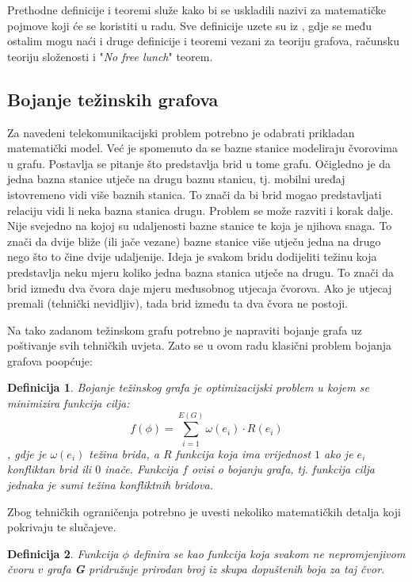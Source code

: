 \documentclass[times, utf8, diplomski, numeric]{fer}
\newtheorem{definition}{Definicija}
\begin{document}
Prethodne definicije i teoremi služe kako bi se uskladili nazivi za matematičke pojmove koji će se koristiti u radu. Sve definicije uzete su iz \cite{lit16, lit15, lit19}, gdje se među ostalim mogu naći i druge definicije i teoremi vezani za teoriju grafova, računsku teoriju složenosti i "\emph{No free lunch}" teorem.

\subsection{Bojanje težinskih grafova}

Za navedeni telekomunikacijski problem potrebno je odabrati prikladan matematički model. Već je spomenuto da se bazne stanice modeliraju čvorovima u grafu. Postavlja se pitanje što predstavlja brid u tome grafu. Očigledno je da jedna bazna stanice utječe na drugu baznu stanicu, tj. mobilni uređaj istovremeno vidi više baznih stanica. To znači da bi brid mogao predstavljati relaciju vidi li neka bazna stanica drugu. Problem se može razviti i korak dalje. Nije svejedno na kojoj su udaljenosti bazne stanice te koja je njihova snaga. To znači da dvije bliže (ili jače vezane) bazne stanice više utječu jedna na drugo nego što to čine dvije udaljenije. Ideja je svakom bridu dodijeliti težinu koja predstavlja neku mjeru koliko jedna bazna stanica utječe na drugu. To znači da brid između dva čvora daje mjeru međusobnog utjecaja čvorova. Ako je utjecaj premali (tehnički nevidljiv), tada brid između ta dva čvora ne postoji.

Na tako zadanom težinskom grafu potrebno je napraviti bojanje grafa uz poštivanje svih tehničkih uvjeta. Zato se u ovom radu klasični problem bojanja grafova poopćuje:

\begin{definition}
Bojanje težinskog grafa je optimizacijski problem u kojem se minimizira funkcija cilja:
\begin{equation}
f(\phi) = \sum_{i=1}^{E(G)} \omega(e_i) \cdot R(e_i)
\end{equation}
, gdje je $\omega(e_i)$ težina brida, a $R$ funkcija koja ima vrijednost $1$ ako je $e_i$ konfliktan brid ili $0$ inače. Funkcija $f$ ovisi o bojanju grafa, tj. funkcija cilja jednaka je sumi težina konfliktnih bridova.
\end{definition}

Zbog tehničkih ograničenja potrebno je uvesti nekoliko matematičkih detalja koji pokrivaju te slučajeve.

\begin{definition}
Funkcija $\phi$ definira se kao funkcija koja svakom ne nepromjenjivom čvoru $v$ grafa \textbf{G} pridružuje prirodan broj iz skupa dopuštenih boja za taj čvor.
\end{definition}
\end{document}
